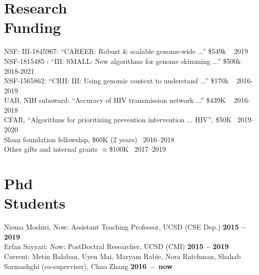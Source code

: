 \documentclass[margin,line,letterpaper]{resume}
\begin{document}
\begin{resume}
\begin{small}
 \vspace{-2mm}
    \section{\mysidestyle Research\\Funding}
      NSF: III-1845967:  ``CAREER: Robust \& scalable genome-wide ...''
 \$549k ~
 \hfill 2019\\
      NSF-1815485 :  ``III: SMALL: New algorithms for genome skimming ...''
 \hfill \$500k ~
 \hfill 2018-2021\\
 NSF-1565862:  ``CRII: III: Using genomic context to understand ...''
 \hfill  \$170k ~
 \hfill 2016-2019\\
 UAB, NIH subaward:  ``Accuracy of HIV transmission network ...''
 \hfill  \$439K ~
 \hfill 2016-2018\\
 CFAR, ``Algorithms for prioritizing prevention intervention ... HIV'', \$50K \hfill  ~2019--2020\\
  Sloan foundation fellowship, \$60K (2 years) \hfill  ~2016--2018\\
 Other gifts and internal grants $\approx$\$100K  \hfill  ~2017--2019

\section{\mysidestyle Phd \\Students}
    Niema Moshiri, Now: Assistant Teaching Professor, UCSD (CSE Dep.)
 \hfill \textbf{2015 -- 2019}\\
     Erfan Sayyari:  Now: PostDoctral Researcher, UCSD (CMI)
 \hfill \textbf{2015 -- 2019}\\
Current: Metin Balaban, Uyen Mai, Maryam Rabie, Nora Ratchman, Shahab Sarmashghi (co-superviser), Chao Zhang \hfill \textbf{2016~--~now}
 
 \vspace{-2mm}

\end{small}
\end{resume}
\end{document}
